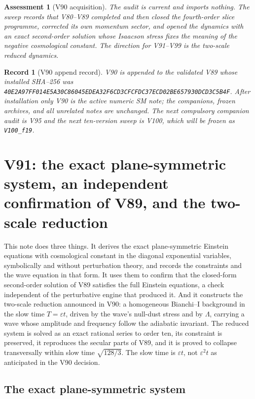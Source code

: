\documentclass[11pt]{article}
\newtheorem{assessment}[theorem]{Assessment}
\newtheorem{record}[theorem]{Record}
\theoremstyle{remark}
\begin{document}
\begin{assessment}[V90 acquisition]
\label{ass:v19v90}
The audit is current and imports nothing.  The sweep records that
V80--V89 completed and then closed the fourth-order slice programme,
corrected its own momentum sector, and opened the dynamics with an
exact second-order solution whose Isaacson stress fixes the meaning
of the negative cosmological constant.  The direction for V91--V99 is
the two-scale reduced dynamics.
\end{assessment}

\begin{record}[V90 append record]
\label{rec:v19v90}
V90 is appended to the validated V89 whose installed SHA--256 was
\texttt{40E2A97FF014E5A30C86045EDEA32F6CD3CFCFDC37ECD02BE657930DCD3C5B4F}.
After installation only V90 is the active numeric SM note; the
companions, frozen archives, and all unrelated notes are unchanged.  The
next compulsory companion audit is V95 and the next ten-version sweep
is V100, which will be frozen as \texttt{V100\_f19}.
\end{record}


\section{V91: the exact plane-symmetric system, an independent confirmation of V89, and the two-scale reduction}
\label{sec:v19v91}

This note does three things.  It derives the exact plane-symmetric
Einstein equations with cosmological constant in the diagonal
exponential variables, symbolically and without perturbation theory,
and records the constraints and the wave equation in that form.  It
uses them to confirm that the closed-form second-order solution of V89
satisfies the full Einstein equations, a check independent of the
perturbative engine that produced it.  And it constructs the
two-scale reduction announced in V90: a homogeneous Bianchi--I
background in the slow time \(T=\varepsilon t\), driven by the wave's
null-dust stress and by \(\Lambda\), carrying a wave whose amplitude
and frequency follow the adiabatic invariant.  The reduced system is
solved as an exact rational series to order ten, its constraint is
preserved, it reproduces the secular parts of V89, and it is proved
to collapse transversally within slow time \(\sqrt{128/3}\).  The
slow time is \(\varepsilon t\), not \(\varepsilon^2t\) as anticipated
in the V90 decision.

\subsection{The exact plane-symmetric system}
\end{document}
